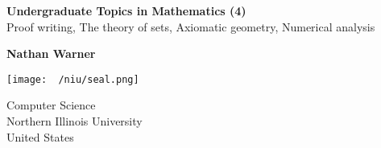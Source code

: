 \documentclass{report}
\title{\Huge{}}
\author{\huge{Nathan Warner}}
\date{\huge{}}
\begin{document}
        \begin{titlepage}
       \begin{center}
           \vspace*{1cm}
    
           \textbf{Undergraduate Topics in Mathematics (4)} \\
           Proof writing, The theory of sets, Axiomatic geometry, Numerical analysis
    
           \vspace{0.5cm}
            
                
           \vspace{1.5cm}
    
           \textbf{Nathan Warner}
    
           \vfill
                
                
           \vspace{0.8cm}
         
           \texttt{[image: ~/niu/seal.png]}
                
           Computer Science \\
           Northern Illinois University\\
           United States\\
           
                
       \end{center}
    \end{titlepage}
    \tableofcontents
    \pagebreak 
    \bigbreak \noindent 
\end{document}
